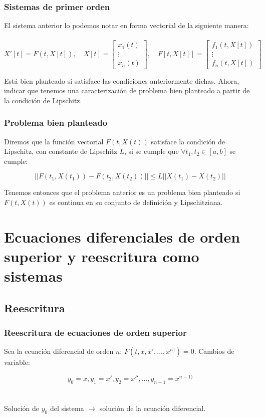 \documentclass{beamer}
\begin{document}
\begin{frame}
    \frametitle{Sistemas de primer orden}
	El sistema anterior lo podemos notar en forma vectorial de la siguiente manera:\\~\\

	$$ X'[t] = F(t, X[t]), \quad 
	X[t] = \begin{bmatrix}
    x_1(t) \\
    \vdots \\
    x_n(t)
    \end{bmatrix}, \quad
    F[t, X[t]] = \begin{bmatrix}
    f_1(t, X[t]) \\
    \vdots \\
    f_n(t, X[t])
    \end{bmatrix} $$
    
    Está bien planteado si satisface las condiciones anteriormente dichas.
    Ahora, indicar que tenemos una caracterización de problema bien planteado a partir de la condición de Lipschitz.
\end{frame}

\begin{frame}
	\frametitle{Problema bien planteado}
	
	 Diremos que la función vectorial $F(t, X(t))$ satisface la condición de Lipschitz, con constante de Lipschitz $L$, si se cumple que $\forall t_1, t_2 \in [a,b]$ se cumple:
	 
	 $$ ||F(t_1, X(t_1)) - F(t_2, X(t_2))|| \leq L||X(t_1) - X(t_2)||$$
	 
	 Tenemos entonces que el problema anterior es un problema bien planteado si $F (t, X(t))$ es continua en su conjunto de definición y Lipschitziana.
	 
\end{frame}

\section{Ecuaciones diferenciales de orden superior y reescritura como sistemas}
\subsection{Reescritura}
\begin{frame}
	\frametitle{Reescritura de ecuaciones de orden superior}

	Sea la ecuación diferencial de orden $n$: $ F(t, x, x', ..., x^{n)}) = 0 $. Cambios de variable:

	$$y_0 = x, y_1 = x', y_2 = x'', \dots, y_{n-1} = x^{n-1)}$$\\~\\

	Solución de $y_0$ del sistema $\rightarrow$ solución de la ecuación diferencial.

\end{frame}
\end{document}
